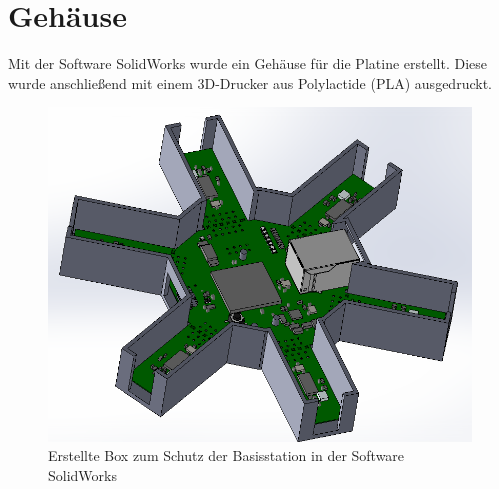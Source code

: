\section{Gehäuse}
\label{app:Gehause}
Mit der Software SolidWorks wurde ein Gehäuse für die Platine erstellt. Diese wurde anschließend mit einem 3D-Drucker aus Polylactide (PLA) ausgedruckt.
\begin{figure}[H]
\centering
\includegraphics[width=\linewidth]{Abbildungen/Aufnahmen/Bilder/SolidWorks/BoxBildschirmSW}
\caption{Erstellte Box zum Schutz der Basisstation in der Software SolidWorks}
\label{fig:boxbildschirmsw}
\end{figure}




